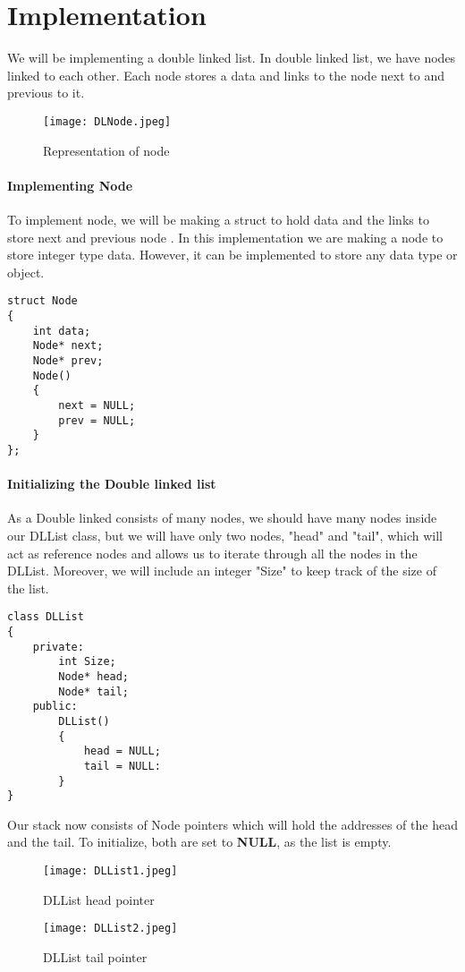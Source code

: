 \documentclass[11pt,fleqn]{book} %
\begin{document}
\section{Implementation}
We will be implementing a double linked list. In double linked list, we have nodes linked to each other.
Each node stores a data and links to the node next to and previous to it.
\begin{figure}[H]
	\centering
	\texttt{[image: DLNode.jpeg]}
	\caption{Representation of node}
\end{figure}
\paragraph{Implementing Node}
To implement node, we will be making a struct to hold data and the links to store next and previous node . In this implementation we are making a node to store integer type data. However, it can be implemented to store any data type or object.
\begin{lstlisting}
struct Node
{
	int data;
	Node* next;
	Node* prev;
	Node()
	{
		next = NULL;
		prev = NULL;
	}
};
\end{lstlisting}
\paragraph{Initializing the Double linked list}
As a Double linked consists of many nodes, we should have many nodes inside our DLList class, but we will have only two nodes, "head" and "tail", which will act as reference nodes and allows us to iterate through all the nodes in the DLList. Moreover, we will include an integer "Size" to keep track of the size of the list.
\begin{lstlisting}
class DLList
{
	private:
		int Size;
		Node* head;
		Node* tail;
	public:
		DLList()
		{
			head = NULL;
			tail = NULL:
		}
}
\end{lstlisting}
Our stack now consists of Node pointers which will hold the addresses of the head and the tail. To initialize, both are set to \textbf{NULL}, as the list is empty.
\begin{figure}[H]
	\centering
	\texttt{[image: DLList1.jpeg]}
	\caption{DLList head pointer}
\end{figure}
\begin{figure}[H]
	\centering
	\texttt{[image: DLList2.jpeg]}
	\caption{DLList tail pointer}
\end{figure}
\end{document}
